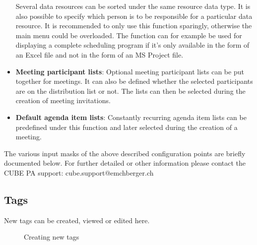 \begin{itemize}
Several data resources can be sorted under the same resource data type. It is also possible to specify which person is to be responsible for a particular data resource. It is recommended to only use this function sparingly, otherwise the main menu could be overloaded. The function can for example be used for displaying a complete scheduling program if it's only available in the form of an Excel file and not in the form of an MS Project file.
\item
\textbf{Meeting participant lists}: Optional meeting participant lists can be put together for meetings. It can also be defined whether the selected participants are on the distribution list or not. The lists can then be selected during the creation of meeting invitations.
\item
\textbf{Default agenda item lists}: Constantly recurring agenda item lists can be predefined under this function and later selected during the creation of a meeting.
\end{itemize}

\vspace{\baselineskip}

The various input masks of the above described configuration points are briefly documented below. For further detailed or other information please contact the CUBE PA support: {\color{red} cube.support@emchberger.ch}

\subsection{Tags}

New tags can be created, viewed or edited here.

\begin{figure}[H]
\caption{Creating new tags}
\end{figure}

